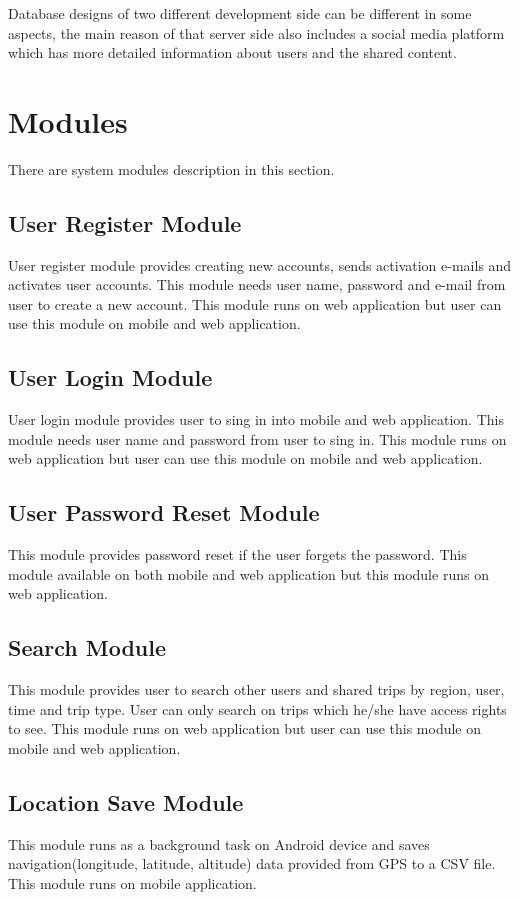 Database designs of two different development side can be different in some aspects, the main reason of that server side also includes a social media platform which has more detailed information about users and the shared content. 

\newpage

\section{Modules}

There are system modules description in this section.

\subsection{User Register Module}
User register module provides creating new accounts, sends activation e-mails and activates user accounts. This module needs user name, password and e-mail from user to create a new account. This module runs on web application but user can use this module on mobile and web application.
\subsection{User Login Module}
User login module provides user to sing in into mobile and web application. This module needs user name and password from user to sing in. This module runs on web application but user can use this module on mobile and web application.
\subsection{User Password Reset Module}
This module provides password reset if the user forgets the password. This module available on both mobile and web application but this module runs on web application.
\subsection{Search Module}
This module provides user to search other users and shared trips by region, user, time and trip type. User can only search on trips which he/she have access rights to see. This module runs on web application but user can use this module on mobile and web application. 
\subsection{Location Save Module}
This module runs as a background task on Android device and saves navigation(longitude, latitude, altitude) data provided from GPS to a CSV file. This module runs on mobile application.

